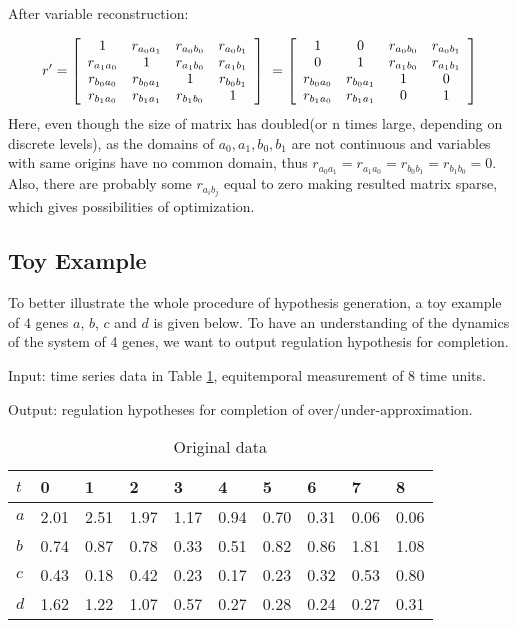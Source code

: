 After variable reconstruction:

$$r'=\left[
\begin{array}{*{20}c}
1 & r_{a_0a_1}& r_{a_0b_0}&r_{a_0b_1}\\
r_{a_1a_0} & 1& r_{a_1b_0}&r_{a_1b_1}\\
r_{b_0a_0} & r_{b_0a_1}& 1&r_{b_0b_1}\\
r_{b_1a_0} & r_{b_1a_1}& r_{b_1b_0}&1\\
\end{array}
\right]\ =\left[\begin{array}{*{20}c}
1 & 0& r_{a_0b_0}&r_{a_0b_1}\\
0 & 1& r_{a_1b_0}&r_{a_1b_1}\\
r_{b_0a_0} & r_{b_0a_1}& 1&0\\
r_{b_1a_0} & r_{b_1a_1}& 0&1\\
\end{array}\right]$$
Here, even though the size of matrix has doubled(or n times large, depending on discrete levels), as the domains of $a_0,a_1,b_0,b_1$ are not continuous and variables with same origins have no common domain, thus $r_{a_0a_1}=r_{a_1a_0}=r_{b_0b_1}=r_{b_1b_0}=0$. Also, there are probably some $r_{a_ib_j}$ equal to zero making resulted matrix sparse, which gives possibilities of optimization.
\subsection{Toy Example}
To better illustrate the whole procedure of hypothesis generation, a toy example of $4$ genes $a$, $b$, $c$ and $d$ is given below. To have an understanding of the dynamics of the system of 4 genes, we want to output regulation hypothesis for completion.

Input: time series data in Table \ref{TyTable1}, equitemporal measurement of 8 time units.

Output: regulation hypotheses for completion of over/under-approximation.

\begin{table}[!ht]
\centering
\begin{tabular}{*{10}{l}}
$t$&0&1&2&3&4&5&6&7&8\\
\hline
$a$&2.01&2.51&1.97&1.17&0.94&0.70&0.31&0.06&0.06\\
$b$&0.74&0.87&0.78&0.33&0.51&0.82&0.86&1.81&1.08\\
$c$&0.43&0.18&0.42&0.23&0.17&0.23&0.32&0.53&0.80\\
$d$&1.62&1.22&1.07&0.57&0.27&0.28&0.24&0.27&0.31
\end{tabular} 
\caption{Original data}\label{TyTable1}
\end{table}



